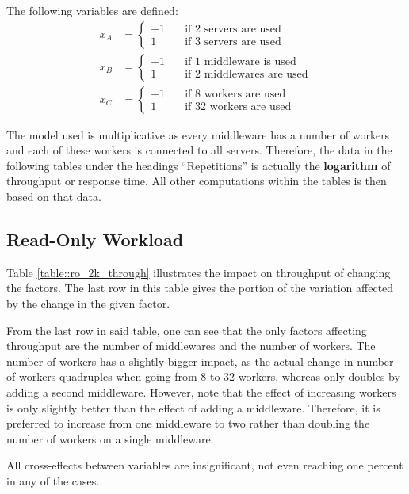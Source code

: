 \documentclass[11pt,a4paper]{article}
\begin{document}
The following variables are defined:
\begin{align}
    x_A &=
    \begin{cases}
        -1 \quad &\text{if 2 servers are used}\\
        1 \quad &\text{if 3 servers are used}
    \end{cases}\label{eq::x_a}\\
    x_B &=
    \begin{cases}
        -1 \quad &\text{if 1 middleware is used}\\
        1 \quad &\text{if 2 middlewares are used}
    \end{cases}\label{eq::x_b}\\
    x_C &=
    \begin{cases}
        -1 \quad &\text{if 8 workers are used}\\
        1 \quad &\text{if 32 workers are used}
    \end{cases}\label{eq::x_c}
\end{align}

The model used is multiplicative as every middleware has a number of workers and each of these workers is connected to all servers. Therefore, the data in the following tables under the headings ``Repetitions'' is actually the \textbf{logarithm} of throughput or response time. All other computations within the tables is then based on that data.

\subsection{Read-Only Workload}
Table \ref{table::ro_2k_through} illustrates the impact on throughput of changing the factors. The last row in this table gives the portion of the variation affected by the change in the given factor.

From the last row in said table, one can see that the only factors affecting throughput are the number of middlewares and the number of workers. The number of workers has a slightly bigger impact, as the actual change in number of workers quadruples when going from 8 to 32 workers, whereas only doubles by adding a second middleware. However, note that the effect of increasing workers is only slightly better than the effect of adding a middleware. Therefore, it is preferred to increase from one middleware to two rather than doubling the number of workers on a single middleware.

All cross-effects between variables are insignificant, not even reaching one percent in any of the cases.
\end{document}
